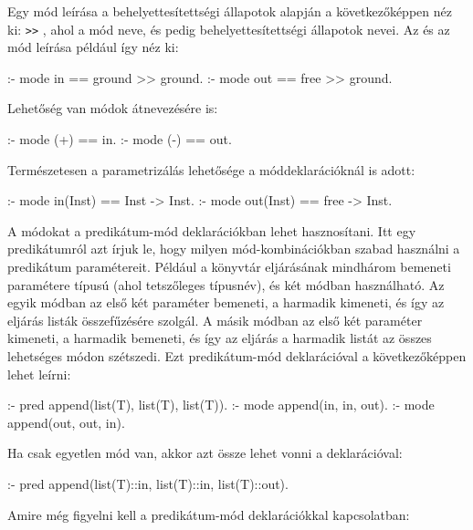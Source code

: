 Egy mód leírása a behelyettesítettségi állapotok alapján a következőképpen néz ki:
  \cd{==}  \verb`>>` , ahol
 a mód neve,  és  pedig behelyettesítettségi állapotok
nevei. Az  és az  mód leírása például így néz ki:

\begin{prologcode}
:- mode in == ground >> ground.
:- mode out == free >> ground.
\end{prologcode}

Lehetőség van módok átnevezésére is:   \cd{==} 

\begin{prologcode}
:- mode (+) == in.
:- mode (-) == out.
\end{prologcode}

Természetesen a parametrizálás lehetősége a móddeklarációknál is adott:

\begin{prologcode}
:- mode in(Inst) == Inst -> Inst.
:- mode out(Inst) == free -> Inst.
\end{prologcode}

A módokat a predikátum-mód deklarációkban lehet hasznosítani. Itt egy predikátumról
azt írjuk le, hogy milyen mód-kombinációkban szabad használni a predikátum paramétereit.
Például a  könyvtár  eljárásának mindhárom bemeneti paramétere
 típusú (ahol  tetszőleges típusnév), és két módban használható.
Az egyik módban az első két paraméter bemeneti, a harmadik kimeneti, és így az
eljárás listák összefűzésére szolgál. A másik módban az első két paraméter kimeneti,
a harmadik bemeneti, és így az eljárás a harmadik listát az összes lehetséges módon
szétszedi. Ezt predikátum-mód deklarációval a következőképpen lehet leírni:

\begin{prologcode}
:- pred append(list(T), list(T), list(T)).
:- mode append(in, in, out).
:- mode append(out, out, in).
\end{prologcode}

Ha csak egyetlen mód van, akkor azt össze lehet vonni a  deklarációval:

\begin{prologcode}
:- pred append(list(T)::in, list(T)::in, list(T)::out).
\end{prologcode}

Amire még figyelni kell a predikátum-mód deklarációkkal kapcsolatban:

